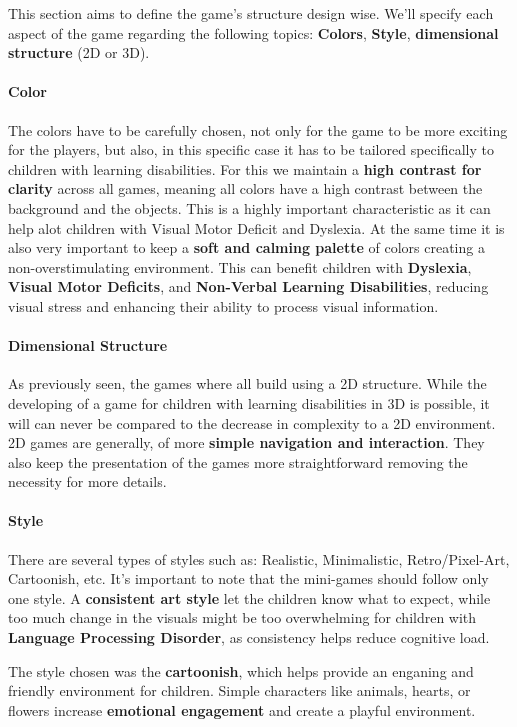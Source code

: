 This section aims to define the game's structure design wise. We'll specify each aspect of the game regarding the following topics: \textbf{Colors}, \textbf{Style}, \textbf{dimensional structure} (2D or 3D).

\paragraph{Color}
The colors have to be carefully chosen, not only for the game to be more exciting for the players, but also, in this specific case it has to be tailored specifically to children with learning disabilities.
For this we maintain a \textbf{high contrast for clarity} across all games, meaning all colors have a high contrast between the background and the objects. This is a highly important characteristic as it can help alot children with Visual Motor Deficit and Dyslexia.
At the same time it is also very important to keep a \textbf{soft and calming palette} of colors creating a non-overstimulating environment. This can benefit children with \textbf{Dyslexia}, \textbf{Visual Motor Deficits}, and \textbf{Non-Verbal Learning Disabilities}, reducing visual stress and enhancing their ability to process visual information.

\paragraph{Dimensional Structure}
As previously seen, the games where all build using a 2D structure. While the developing of a game for children with learning disabilities in 3D is possible, it will can never be compared to the decrease in complexity to a 2D environment. 2D games are generally, of more \textbf{simple navigation and interaction}. They also keep the presentation of the games more straightforward removing the necessity for more details.

\paragraph{Style}
There are several types of styles such as: Realistic, Minimalistic, Retro/Pixel-Art, Cartoonish, etc.
It's important to note that the mini-games should follow only one style. A \textbf{consistent art style} let the children know what to expect, while too much change in the visuals might be too overwhelming for children with \textbf{Language Processing Disorder}, as consistency helps reduce cognitive load.

The style chosen was the \textbf{cartoonish}, which helps provide an enganing and friendly environment for children. Simple characters like animals, hearts, or flowers increase \textbf{emotional engagement} and create a playful environment.

